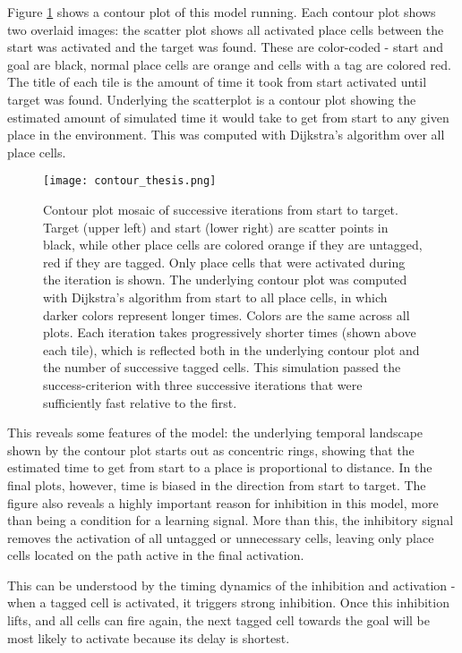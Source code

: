 \documentclass{article}
\begin{document}
Figure \ref{contour_plot} shows a contour plot of this model running. Each contour plot shows two overlaid images: the scatter plot shows all activated place cells between the start was activated and the target was found. These are color-coded - start and goal are black, normal place cells are orange and cells with a tag are colored red. The title of each tile is the amount of time it took from start activated until target was found.
Underlying the scatterplot is a contour plot showing the estimated amount of simulated time it would take to get from start to any given place in the environment. This was computed with Dijkstra's algorithm over all place cells. 

\begin{figure}[H]
    \texttt{[image: contour\_thesis.png]}
    \caption{Contour plot mosaic of successive iterations from start to target. Target (upper left) and start (lower right) are scatter points in black, while other place cells are colored orange if they are untagged, red if they are tagged. Only place cells that were activated during the iteration is shown. The underlying contour plot was computed with Dijkstra's algorithm from start to all place cells, in which darker colors represent longer times. Colors are the same across all plots. Each iteration takes progressively shorter times (shown above each tile), which is reflected both in the underlying contour plot and the number of successive tagged cells. This simulation passed the success-criterion with three successive iterations that were sufficiently fast relative to the first.}
    \label{contour_plot}
\end{figure}

This reveals some features of the model: the underlying temporal landscape shown by the contour plot starts out as concentric rings, showing that the estimated time to get from start to a place is proportional to distance. In the final plots, however, time is biased in the direction from start to target.
The figure also reveals a highly important reason for inhibition in this model, more than being a condition for a learning signal. More than this, the inhibitory signal removes the activation of all untagged or unnecessary cells, leaving only place cells located on the path active in the final activation. 

This can be understood by the timing dynamics of the inhibition and activation - when a tagged cell is activated, it triggers strong inhibition. Once this inhibition lifts, and all cells can fire again, the next tagged cell towards the goal will be most likely to activate because its delay is shortest. 
\end{document}
